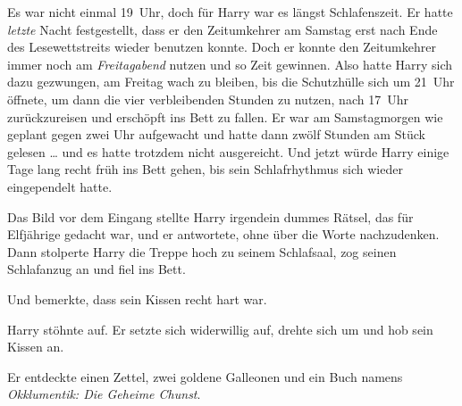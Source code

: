 Es war nicht einmal 19~Uhr, doch für Harry war es längst Schlafenszeit. Er hatte \emph{letzte} Nacht festgestellt, dass er den Zeitumkehrer am Samstag erst nach Ende des Lesewettstreits wieder benutzen konnte. Doch er konnte den Zeitumkehrer immer noch am \emph{Freitagabend} nutzen und so Zeit gewinnen. Also hatte Harry sich dazu gezwungen, am Freitag wach zu bleiben, bis die Schutzhülle sich um 21~Uhr öffnete, um dann die vier verbleibenden Stunden zu nutzen, nach 17~Uhr zurückzureisen und erschöpft ins Bett zu fallen. Er war am Samstagmorgen wie geplant gegen zwei Uhr aufgewacht und hatte dann zwölf Stunden am Stück gelesen … und es hatte trotzdem nicht ausgereicht. Und jetzt würde Harry einige Tage lang recht früh ins Bett gehen, bis sein Schlafrhythmus sich wieder eingependelt hatte.

Das Bild vor dem Eingang stellte Harry irgendein dummes Rätsel, das für Elfjährige gedacht war, und er antwortete, ohne über die Worte nachzudenken. Dann stolperte Harry die Treppe hoch zu seinem Schlafsaal, zog seinen Schlafanzug an und fiel ins Bett.

Und bemerkte, dass sein Kissen recht hart war.

Harry stöhnte auf. Er setzte sich widerwillig auf, drehte sich um und hob sein Kissen an.

Er entdeckte einen Zettel, zwei goldene Galleonen und ein Buch namens \emph{Okklumentik: Die Geheime Chunst}.%

